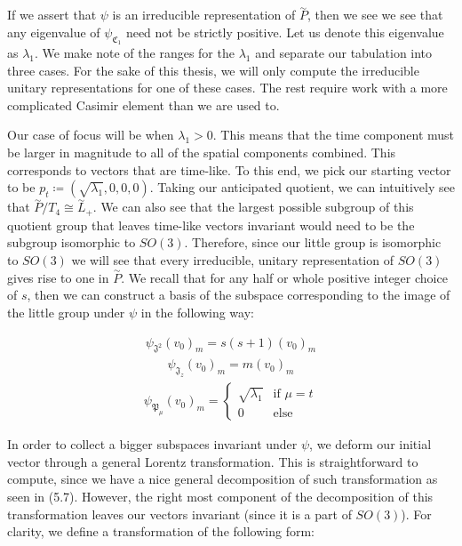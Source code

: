 \documentclass[10pt]{ucthesis}
\begin{document}
If we assert that $\psi$ is an irreducible representation of $\overset{\sim}{P}$, then we see we see that any eigenvalue of $\psi_{\mathfrak{C}_1}$ need not be strictly positive. Let us denote this eigenvalue as $\lambda_1$. We make note of the ranges for the $\lambda_1$ and separate our tabulation into three cases. For the sake of this thesis, we will only compute the irreducible unitary representations for one of these cases. The rest require work with a more complicated Casimir element than we are used to.

Our case of focus will be when $\lambda_1 > 0$. This means that the time component must be larger in magnitude to all of the spatial components combined. This corresponds to vectors that are time-like. To this end, we pick our starting vector to be $p_t \coloneq (\sqrt{\lambda_1},0,0,0)$. Taking our anticipated quotient, we can intuitively see that $\overset{\sim}{P}/T_4 \cong \overset{\sim}{L}_+$. We can also see that the largest possible subgroup of this quotient group that leaves time-like vectors invariant would need to be the subgroup isomorphic to $SO(3)$. Therefore, since our little group is isomorphic to $SO(3)$ we will see that every irreducible, unitary representation of $SO(3)$ gives rise to one in $\overset{\sim}{P}$. We recall that for any half or whole positive integer choice of $s$, then we can construct a basis of the subspace corresponding to the image of the little group under $\psi$ in the following way:

\begin{equation}
\begin{aligned}
	\psi_{\mathfrak{J}^2} (v_0)_m = s(s+1)(v_0)_m
\end{aligned}
\end{equation}
\begin{equation}
\begin{aligned}
	\psi_{\mathfrak{J}_z} (v_0)_m = m(v_0)_m
\end{aligned}
\end{equation}
\begin{equation}
\begin{aligned}
	\psi_{\mathfrak{P}_\mu} (v_0)_m = \begin{cases}
										\sqrt{\lambda_1} & \text{if } \mu=t\\
										0 & \text{else}
										\end{cases}
\end{aligned}
\end{equation}

In order to collect a bigger subspaces invariant under $\psi$, we deform our initial vector through a general Lorentz transformation. This is straightforward to compute, since we have a nice general decomposition of such transformation as seen in (5.7). However, the right most component of the decomposition of this transformation leaves our vectors invariant (since it is a part of $SO(3)$). For clarity, we define a transformation of the following form:
\end{document}
